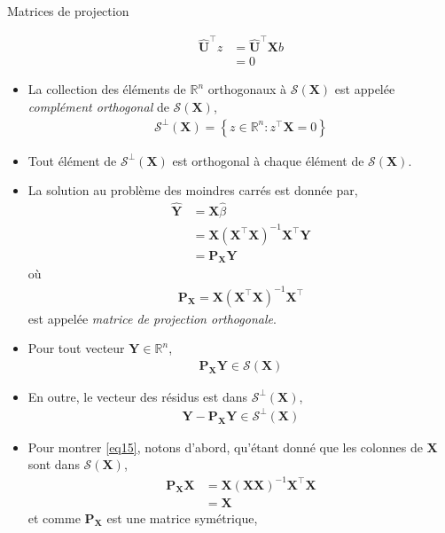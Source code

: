 \begin{frame}[allowframebreaks]{Matrices de projection}
\begin{itemize}
\begin{align*}
\widehat{\mathbf{U}}^\top z &= \widehat{\mathbf{U}}^\top\mathbf{X}b\\
& = 0
\end{align*}
\item La collection des éléments de $\mathbb{R}^n$ orthogonaux à $\mathcal{S}(\mathbf{X})$ est appelée \emph{complément orthogonal} de $\mathcal{S}(\mathbf{X})$,
\begin{align*}
\mathcal{S}^\perp(\mathbf{X}) = \left\{z \in \mathbb{R}^n: z^\top\mathbf{X}=0\right\}
\end{align*}
\item Tout élément de $\mathcal{S}^\perp(\mathbf{X})$ est orthogonal à chaque élément de $\mathcal{S}(\mathbf{X})$.
\item La solution au problème des moindres carrés est donnée par,
\begin{align*}
\widehat{\mathbf{Y}} &= \mathbf{X}\widehat{\beta}\\
&=\mathbf{X}(\mathbf{X}^\top\mathbf{X})^{-1}\mathbf{X}^\top\mathbf{Y}\\
&=\mathbf{P}_{\mathbf{X}}\mathbf{Y}
\end{align*}
où 
\begin{align*} \mathbf{P}_{\mathbf{X}} = \mathbf{X}(\mathbf{X}^\top\mathbf{X})^{-1}\mathbf{X}^\top
\end{align*}
est appelée \emph{matrice de projection orthogonale}. 
\item Pour tout vecteur $\mathbf{Y}\in\mathbb{R}^n$,
\begin{align*}
\mathbf{P}_{\mathbf{X}}\mathbf{Y} \in \mathcal{S}(\mathbf{X})
\end{align*}
\item En outre, le vecteur des résidus est dans  $\mathcal{S}^\perp(\mathbf{X})$,
\begin{align}
\mathbf{Y} - \mathbf{P}_{\mathbf{X}}\mathbf{Y} \in \mathcal{S}^\perp(\mathbf{X})
\label{eq15}
\end{align}
\item Pour montrer \eqref{eq15}, notons d'abord, qu'étant donné que les colonnes de $\mathbf{X}$ sont dans $\mathcal{S}(\mathbf{X})$,
\begin{align*}
\mathbf{P}_\mathbf{X}\mathbf{X} &= \mathbf{X}(\mathbf{X}\mathbf{X})^{-1}\mathbf{X}^\top\mathbf{X}\\
&=\mathbf{X}
\end{align*}
et comme $\mathbf{P}_\mathbf{X}$ est une matrice symétrique,
\begin{align*}

\end{align*}
\end{itemize}
\end{frame}
